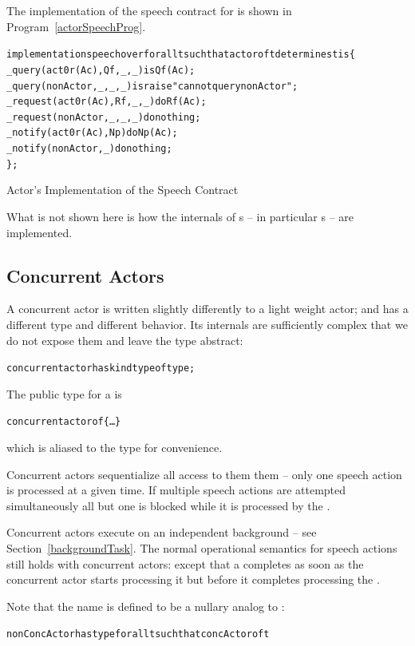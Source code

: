 The implementation of the speech contract for  is shown in Program~\vref{actorSpeechProg}.

\begin{program}
\begin{alltt}
implementation speech over for all t such that actor of t determines t is \{
  \_query(act0r(Ac),Qf,_,_) is Qf(Ac);
  \_query(nonActor,_,_,_) is raise "cannot query nonActor";
  \_request(act0r(Ac),Rf,_,_) do Rf(Ac);
  \_request(nonActor,_,_,_) do nothing;
  \_notify(act0r(Ac),Np) do Np(Ac);
  \_notify(nonActor,_) do nothing;
\};
\end{alltt}
\caption{Actor's Implementation of the Speech Contract}
\label{actorSpeechProg}
\end{program}
\begin{aside}
What is not shown here is how the internals of s -- in particular  s -- are implemented.
\end{aside}

\subsection{Concurrent Actors}
\label{concActor}
A concurrent actor is written slightly differently to a light weight actor; and has a different type and different behavior. Its internals are sufficiently complex that we do not expose them and leave the  type abstract:
\begin{alltt}
concurrent actor has kind type of type;
\end{alltt}
The public type for a  is 
\begin{alltt}
concurrent actor of \{ \ldots \}
\end{alltt}
which is aliased to the  type for convenience.

Concurrent actors sequentialize all access to them them -- only one speech action is processed at a given time. If multiple speech actions are attempted simultaneously all but one is blocked while it is processed by the .

Concurrent actors execute on an independent background  -- see Section~\vref{backgroundTask}. The normal operational semantics for speech actions still holds with concurrent actors: except that a  completes as soon as the concurrent actor starts processing it but before it completes processing the .


Note that the name  is defined to be a nullary analog to :
\begin{alltt}
nonConcActor has type for all t such that concActor of t 
\end{alltt}

